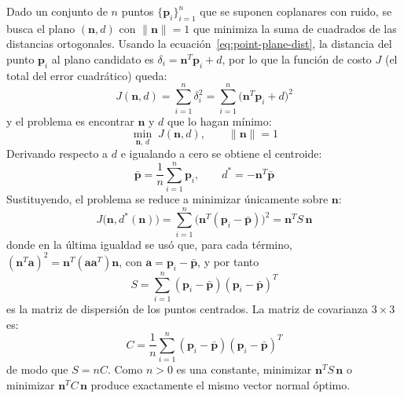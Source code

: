 Dado un conjunto de $n$ puntos $\{\mathbf{p}_i\}_{i=1}^n$ que se suponen
coplanares con ruido, se busca el plano $(\mathbf{n}, d)$ con
$\lVert\mathbf{n}\rVert = 1$ que minimiza la suma de cuadrados de las
distancias ortogonales. Usando la ecuación~\ref{eq:point-plane-dist}, la
distancia del punto $\mathbf{p}_i$ al plano candidato es
$\delta_i = \mathbf{n}^T\mathbf{p}_i + d$, por lo que la función de costo
$J$ (el total del error cuadrático) queda:
\begin{equation}
  \label{eq:ls-objective}
  J(\mathbf{n}, d)
  = \sum_{i=1}^n \delta_i^2
  = \sum_{i=1}^n \bigl(\mathbf{n}^T \mathbf{p}_i + d\bigr)^2
\end{equation}
y el problema es encontrar $\mathbf{n}$ y $d$ que lo hagan mínimo:
\begin{equation}
  \label{eq:ls-min}
  \min_{\mathbf{n},\,d} \; J(\mathbf{n}, d), \qquad \lVert\mathbf{n}\rVert = 1
\end{equation}
Derivando respecto a $d$ e igualando a cero se obtiene el centroide:
\begin{equation}
  \label{eq:centroid}
  \bar{\mathbf{p}} = \frac{1}{n} \sum_{i=1}^n \mathbf{p}_i, \qquad
  d^* = -\mathbf{n}^T \bar{\mathbf{p}}
\end{equation}
Sustituyendo, el problema se reduce a minimizar únicamente sobre
$\mathbf{n}$:
\begin{equation}
  \label{eq:rayleigh-pre}
  J\bigl(\mathbf{n}, d^*(\mathbf{n})\bigr)
  = \sum_{i=1}^n \bigl(\mathbf{n}^T (\mathbf{p}_i - \bar{\mathbf{p}})\bigr)^2
  = \mathbf{n}^T S\, \mathbf{n}
\end{equation}
donde en la última igualdad se usó que, para cada término,
$(\mathbf{n}^T \mathbf{a})^2 = \mathbf{n}^T (\mathbf{a}\mathbf{a}^T)\mathbf{n}$,
con $\mathbf{a} = \mathbf{p}_i - \bar{\mathbf{p}}$, y por tanto
\begin{equation}
  \label{eq:scatter}
  S = \sum_{i=1}^n
      (\mathbf{p}_i - \bar{\mathbf{p}})
      (\mathbf{p}_i - \bar{\mathbf{p}})^T
\end{equation}
es la matriz de dispersión de los puntos centrados. La matriz de
covarianza $3 \times 3$ es:
\begin{equation}
  \label{eq:covariance}
  C = \frac{1}{n} \sum_{i=1}^n
      (\mathbf{p}_i - \bar{\mathbf{p}})
      (\mathbf{p}_i - \bar{\mathbf{p}})^T
\end{equation}
de modo que $S = nC$. Como $n > 0$ es una constante, minimizar
$\mathbf{n}^T S\,\mathbf{n}$ o minimizar $\mathbf{n}^T C\,\mathbf{n}$
produce exactamente el mismo vector normal óptimo.
